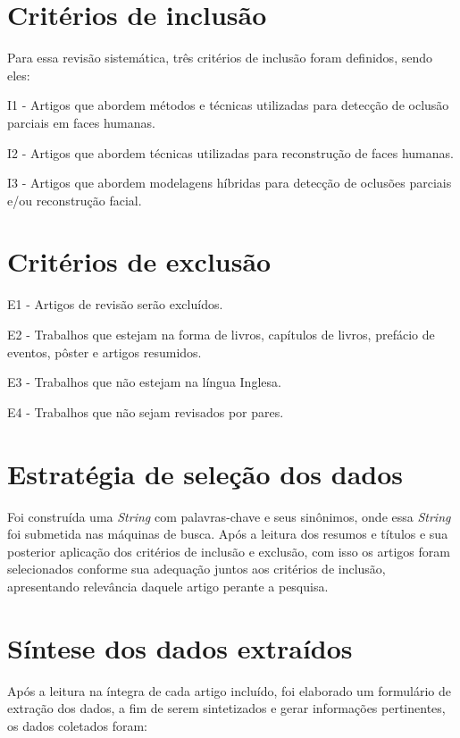 \section{Critérios de inclusão}
Para essa revisão sistemática, três critérios de inclusão foram definidos, sendo eles:

I1 - Artigos que abordem métodos e técnicas utilizadas para detecção de oclusão parciais em faces humanas.

I2 - Artigos que abordem técnicas utilizadas para reconstrução de faces humanas.

I3 - Artigos que abordem modelagens híbridas para detecção de oclusões parciais e/ou reconstrução facial. 


\section{Critérios de exclusão}


E1 - Artigos de revisão serão excluídos.

E2 - Trabalhos que estejam na forma de livros, capítulos de livros, prefácio de eventos, pôster e artigos resumidos.

E3 - Trabalhos que não estejam na língua Inglesa.

E4 - Trabalhos que não sejam revisados por pares.


\section{Estratégia de seleção dos dados}

Foi construída uma \textit{String} com palavras-chave e seus sinônimos, onde essa \textit{String} foi submetida nas máquinas de busca. Após a leitura dos resumos e títulos e sua posterior aplicação dos critérios de inclusão e exclusão, com isso os artigos foram selecionados conforme sua adequação juntos aos critérios de inclusão, apresentando relevância daquele artigo perante a pesquisa. 


\section{Síntese dos dados extraídos}

Após a leitura na íntegra de cada artigo incluído, foi elaborado um formulário de extração dos dados, a fim de serem sintetizados e gerar informações pertinentes, os dados coletados foram:

